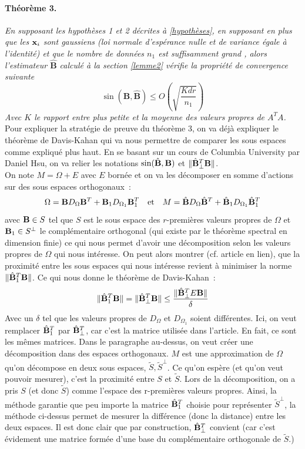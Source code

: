 \documentclass[12pt]{article}
\begin{document}
\paragraph*{Théorème 3.} \textit{En supposant les hypothèses 1 et 2 décrites à \ref{hypothèses}, en supposant en plus que les ${\bf x}_i$ sont gaussiens (loi normale d'espérance nulle et de variance égale à l'identité) et que le nombre de données $n_1$ est suffisamment grand \cite{MTLR_1}, alors l'estimateur $\bm{\hat{B}}$ calculé à la section \ref{lemme2} vérifie la propriété de convergence suivante}
$$
\sin(\bm{B}, \bm{\hat{B}}) \leq O\left(\sqrt{\frac{Kdr}{n_1}}\right)
$$
\textit{Avec $K$ le rapport entre plus petite et la moyenne des valeurs propres de $A^TA$.}\\
Pour expliquer la stratégie de preuve du théorème 3, on va déjà expliquer le théorème de Davis-Kahan qui va nous permettre de comparer les sous espaces comme expliqué plus haut. En se basant sur un cours de Columbia University \cite{DAVIS-KHAN} par Daniel Hsu, on va relier les notations $\sin(\hat{{\bf B}}, {\bf B})$ et $\lVert \hat{{\bf B}}^T_{\perp} {\bf B} \rVert$.\\
On note $M = \Omega + E$ avec $E$ bornée et on va les décomposer en somme d'actions sur des sous espaces orthogonaux~:
$$
\Omega = {\bf B}D_{\Omega}{\bf B}^T + {\bf B}_1D_{\Omega_1}{\bf B}^T_1 \quad \text{et} \quad M = \hat{{\bf B}}D_{\Omega}\hat{{\bf B}}^T + \hat{{\bf B}}_1D_{\Omega_1}\hat{{\bf B}}^T_1
$$
avec ${\bf B} \in S$ tel que $S$ est le sous espace des $r$-premières valeurs propres de $\Omega$ et ${\bf B}_1 \in S^{\perp}$ le complémentaire orthogonal (qui existe par le théorème spectral en dimension finie) ce qui nous permet d'avoir une décomposition selon les valeurs propres de $\Omega$ qui nous intéresse.
On peut alors montrer (cf. article en lien), que la proximité entre les sous espaces qui nous intéresse revient à minimiser la norme $\lVert \hat{{\bf B}}^T_1{\bf B} \rVert$. Ce qui nous donne le théorème de Davis-Kahan~:
$$
\lVert \hat{{\bf B}}^T_1{\bf B} \rVert = \lVert \hat{{\bf B}}^T_{\perp}{\bf B} \rVert \leq \frac{\lVert \hat{{\bf B}}^T_{\perp}E{\bf B} \rVert}{\delta}
$$
Avec un $\delta$ tel que les valeurs propres de $D_{\Omega}$ et $D_{\Omega_1}$ soient différentes. Ici, on veut remplacer $\hat{\bf B}^T_1$ par $\hat{\bf B}^T_{\perp}$, car c'est la matrice utilisée dans l'article. En fait, ce sont les mêmes matrices. Dans le paragraphe au-dessus, on veut créer une décomposition dans des espaces orthogonaux. $M$ est une approximation de $\Omega$ qu'on décompose en deux sous espaces, $\tilde{S}, \tilde{S}^{\perp}$. Ce qu'on espère (et qu'on veut pouvoir mesurer), c'est la proximité entre $S$ et $\tilde{S}$. Lors de la décomposition, on a pris $S$ (et donc $\tilde{S}$) comme l'espace des r-premières valeurs propres. Ainsi, la méthode garantie que peu importe la matrice $\hat{\bf B}^T_1$ choisie pour représenter  $\tilde{S}^{\perp}$, la méthode ci-dessus permet de mesurer la différence (donc la distance) entre les deux espaces. Il est donc clair que par construction, $\hat{\bf B}^T_{\perp}$ convient (car c'est évidement une matrice formée d'une base du complémentaire orthogonale de $\tilde{S}$.)\\
\end{document}
